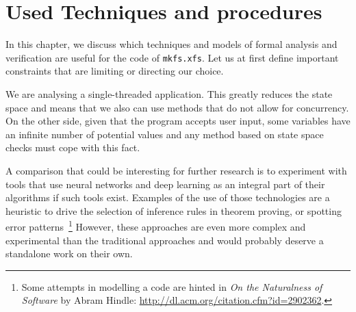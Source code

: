 
\chapter{Used Techniques and procedures}\label{chap:techniques}

In this chapter, we discuss which techniques and models of formal analysis and verification are useful for the code of {\tt mkfs.xfs}. Let us at first define important constraints that are limiting or directing our choice.

We are analysing a single-threaded application. This greatly reduces the
state space and means that we also can use methods that do not allow for
concurrency. On the other side, given that the program accepts user input,
some variables have an infinite number of potential values and any method
based on state space checks must cope with this fact.


%

A comparison that could be interesting for further research is to experiment
with tools that use neural networks and deep learning as an integral part of
their algorithms if such tools exist. Examples of the use of those technologies
are a heuristic to drive the selection of inference rules in theorem proving,
or spotting error patterns~\footnote{Some attempts in modelling a code are
hinted in {\em On the Naturalness of Software} by Abram Hindle:
\url{http://dl.acm.org/citation.cfm?id=2902362}.} However, these approaches are
even more complex and experimental than the traditional approaches and
would probably deserve a standalone work on their own.

